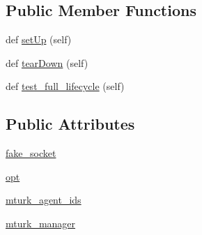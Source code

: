 \subsection*{Public Member Functions}
\begin{DoxyCompactItemize}
\item 
def \hyperlink{classparlai_1_1mturk_1_1core_1_1legacy__2018_1_1test_1_1test__mturk__manager_1_1TestMTurkManagerLifecycleFunctions_ae594591f10f5d6f0ae5f01cd44adac97}{set\+Up} (self)
\item 
def \hyperlink{classparlai_1_1mturk_1_1core_1_1legacy__2018_1_1test_1_1test__mturk__manager_1_1TestMTurkManagerLifecycleFunctions_a12fb26102e0071525ce6f91e9059c72c}{tear\+Down} (self)
\item 
def \hyperlink{classparlai_1_1mturk_1_1core_1_1legacy__2018_1_1test_1_1test__mturk__manager_1_1TestMTurkManagerLifecycleFunctions_a432f7aa1cf39443f240ed3024ddfbc56}{test\+\_\+full\+\_\+lifecycle} (self)
\end{DoxyCompactItemize}
\subsection*{Public Attributes}
\begin{DoxyCompactItemize}
\item 
\hyperlink{classparlai_1_1mturk_1_1core_1_1legacy__2018_1_1test_1_1test__mturk__manager_1_1TestMTurkManagerLifecycleFunctions_ae493ff13abfcd39062b9f59646f2cc78}{fake\+\_\+socket}
\item 
\hyperlink{classparlai_1_1mturk_1_1core_1_1legacy__2018_1_1test_1_1test__mturk__manager_1_1TestMTurkManagerLifecycleFunctions_a39afd108df54a9d9b171632344a0a932}{opt}
\item 
\hyperlink{classparlai_1_1mturk_1_1core_1_1legacy__2018_1_1test_1_1test__mturk__manager_1_1TestMTurkManagerLifecycleFunctions_a660878f2fba9edb9380818f7d9a73f8b}{mturk\+\_\+agent\+\_\+ids}
\item 
\hyperlink{classparlai_1_1mturk_1_1core_1_1legacy__2018_1_1test_1_1test__mturk__manager_1_1TestMTurkManagerLifecycleFunctions_a29deb14a49333ddae88f7efe1f6a1f2d}{mturk\+\_\+manager}
\end{DoxyCompactItemize}


